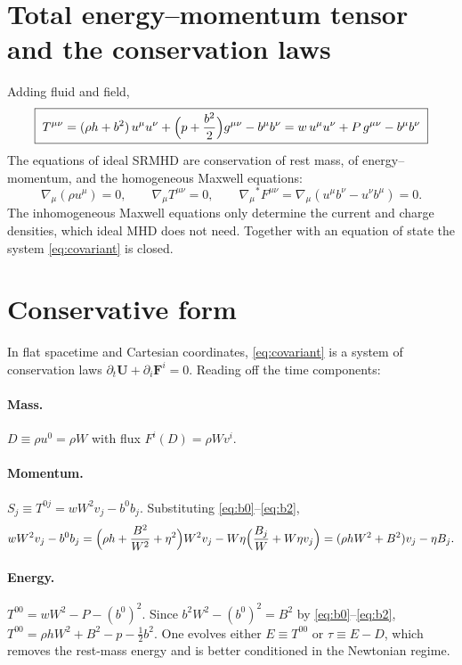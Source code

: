 \documentclass[11pt,a4paper,oneside,openany]{book}
\theoremstyle{definition}
\theoremstyle{plain}
\theoremstyle{remark}
\newcommand{\UU}{\bm{U}}
\newcommand{\FF}{\bm{F}}
\newcommand{\Ptot}{P}
\newcommand{\vB}{\eta}
\begin{document}
\section{Total energy--momentum tensor and the conservation laws}

Adding fluid and field,
\begin{equation}\label{eq:Tmunu}
\boxed{\;T^{\mu\nu}=(\rho h+b^2)\,u^\mu u^\nu+\Bigl(p+\frac{b^2}{2}\Bigr)g^{\mu\nu}-b^\mu b^\nu
=w\,u^\mu u^\nu+\Ptot\,g^{\mu\nu}-b^\mu b^\nu\;}
\end{equation}
The equations of ideal SRMHD are conservation of rest mass, of energy--momentum, and
the homogeneous Maxwell equations:
\begin{equation}\label{eq:covariant}
\nabla_\mu(\rho u^\mu)=0,\qquad
\nabla_\mu T^{\mu\nu}=0,\qquad
\nabla_\mu{}^\ast\!F^{\mu\nu}=\nabla_\mu(u^\mu b^\nu-u^\nu b^\mu)=0 .
\end{equation}
The inhomogeneous Maxwell equations only determine the current and charge densities,
which ideal MHD does not need. Together with an equation of state the system
\eqref{eq:covariant} is closed.

\section{Conservative form}\label{sec:consform}

In flat spacetime and Cartesian coordinates, \eqref{eq:covariant} is a system of
conservation laws $\partial_t\UU+\partial_i\FF^i=0$. Reading off the time components:

\paragraph{Mass.} $D\equiv\rho u^0=\rho W$ with flux $F^i(D)=\rho Wv^i$.

\paragraph{Momentum.} $S_j\equiv T^{0j}=wW^2v_j-b^0b_j$. Substituting
\eqref{eq:b0}--\eqref{eq:b2},
\begin{equation}
wW^2v_j-b^0b_j=\Bigl(\rho h+\frac{B^2}{W^2}+\vB^2\Bigr)W^2v_j-W\vB\Bigl(\frac{B_j}{W}+W\vB v_j\Bigr)
=(\rho hW^2+B^2)v_j-\vB B_j .
\end{equation}

\paragraph{Energy.} $T^{00}=wW^2-\Ptot-(b^0)^2$. Since $b^2W^2-(b^0)^2=B^2$ by
\eqref{eq:b0}--\eqref{eq:b2},
$T^{00}=\rho hW^2+B^2-p-\frac12b^2$. One evolves either $E\equiv T^{00}$ or
$\tau\equiv E-D$, which removes the rest-mass energy and is better conditioned in the
Newtonian regime.
\end{document}
